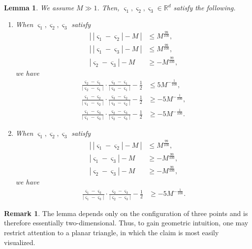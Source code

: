 \documentclass[reqno]{amsart}
\theoremstyle{plain}
\newtheorem{lemma}[theorem]{Lemma}
\theoremstyle{definition}
\newtheorem{remark}{Remark}[section]
\numberwithin{equation}{section}
\newcommand{\1}{\mathbbm{1}}
\begin{document}
\begin{lemma}\label{sankakukeilemma}
We assume $M\gg 1$. Then, $\varsigma_1,\varsigma_2,\varsigma_3\in\mathbb{R}^d$ satisfy the following.
\begin{enumerate}
\item When $\varsigma_1,\varsigma_2,\varsigma_3$ satisfy
\begin{align*}
\left|\ |\varsigma_1-\varsigma_2|-M\ \right|&\leq M^{\frac{99}{100}},
\\
\left|\ |\varsigma_1-\varsigma_3|-M\ \right|&\leq M^{\frac{99}{100}},
\\
|\varsigma_2-\varsigma_3|-M&\geq  -M^{\frac{99}{100}},
\end{align*}
we have
\begin{align*}
\frac{\varsigma_2-\varsigma_1}{|\varsigma_2-\varsigma_1|}\cdot \frac{\varsigma_3-\varsigma_1}{|\varsigma_3-\varsigma_1|}-\frac{1}{2}&\leq 5M^{-\frac{1}{100}},
\\
\frac{\varsigma_1-\varsigma_2}{|\varsigma_1-\varsigma_2|}\cdot \frac{\varsigma_3-\varsigma_2}{|\varsigma_3-\varsigma_2|}-\frac{1}{2}&\geq -5M^{-\frac{1}{100}},
\\
\frac{\varsigma_1-\varsigma_3}{|\varsigma_1-\varsigma_3|}\cdot \frac{\varsigma_2-\varsigma_3}{|\varsigma_2-\varsigma_3|}-\frac{1}{2}&\geq -5M^{-\frac{1}{100}}.
\end{align*}

\item When $\varsigma_1,\varsigma_2,\varsigma_3$ satisfy
\begin{align*}
\left|\ |\varsigma_1-\varsigma_2|-M\ \right|&\leq M^{\frac{99}{100}},
\\
|\varsigma_1-\varsigma_3|-M&\geq -M^{\frac{99}{100}},
\\
|\varsigma_2-\varsigma_3|-M&\geq -M^{\frac{99}{100}},
\end{align*}
we have
\begin{align*}
\frac{\varsigma_1-\varsigma_3}{|\varsigma_1-\varsigma_3|}\cdot \frac{\varsigma_2-\varsigma_3}{|\varsigma_2-\varsigma_3|}-\frac{1}{2}&\geq -5M^{-\frac{1}{100}}.
\end{align*}
\end{enumerate}
\end{lemma}
\begin{remark}
The lemma depends only on the configuration of three points and is therefore essentially two-dimensional. Thus, to gain geometric intuition, one may restrict attention to a planar triangle, in which the claim is most easily visualized.
\end{remark}
\end{document}
